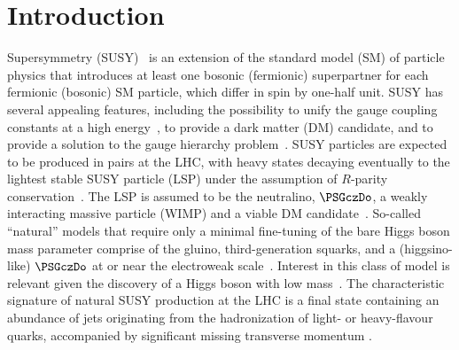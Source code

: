 
\section{Introduction}
\label{sec:introduction}

Supersymmetry (SUSY)~\cite{ref:SUSY-1, ref:SUSY0, ref:SUSY3,
  ref:SUSY1} is an extension of the standard model (SM) of particle
physics that introduces at least one bosonic (fermionic) superpartner
for each fermionic (bosonic) SM particle, which differ in spin by
one-half unit. SUSY has several appealing features, including the
possibility to unify the gauge coupling constants at a high
energy~\cite{Dimopoulos:1981yj, Ibanez:1981yh, Marciano:1981un}, to
provide a dark matter (DM) candidate, and to provide a solution to the
gauge hierarchy problem~\cite{ref:hierarchy1, ref:hierarchy2}. SUSY
particles are expected to be produced in pairs at the LHC, with heavy
states decaying eventually to the lightest stable SUSY particle (LSP)
under the assumption of $R$-parity
conservation~\cite{Farrar:1978xj}. The LSP is assumed to be the
neutralino, $\PSGczDo$, a weakly interacting massive particle (WIMP)
and a viable DM candidate~\cite{Jungman:1995df,
  1674-1137-38-9-090001}. 
So-called ``natural'' models that require only a minimal fine-tuning
of the bare Higgs boson mass parameter comprise of the gluino,
third-generation squarks, and a (higgsino-like) $\PSGczDo$ at or near
the electroweak scale~\cite{ref:barbierinsusy}. Interest in this class
of model is relevant given the discovery of a Higgs boson with low
mass~\cite{Aad:2012tfa, Chatrchyan:2012ufa, Chatrchyan:2013lba,
  Khachatryan:2014jba, Aad:2014aba, Aad:2015zhl}. The characteristic
signature of natural SUSY production at the LHC is a final state
containing an abundance of jets originating from the hadronization of
light- or heavy-flavour quarks, accompanied by significant missing
transverse momentum \ptvecmiss. 


